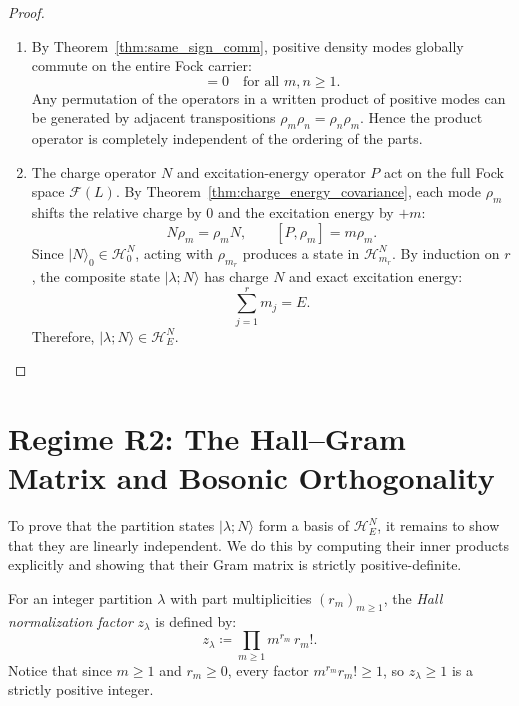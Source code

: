 \begin{proof}
\begin{enumerate}
    \item By Theorem~\ref{thm:same_sign_comm}, positive density modes globally commute on the entire Fock carrier:
    \begin{equation}
    [\rho_m, \rho_n] = 0 \quad \text{for all } m, n \ge 1.
    \end{equation}
    Any permutation of the operators in a written product of positive modes can be generated by adjacent transpositions $\rho_m \rho_n = \rho_n \rho_m$. Hence the product operator is completely independent of the ordering of the parts.
    \item The charge operator $N$ and excitation-energy operator $P$ act on the full Fock space $\mathcal{F}(L)$. By Theorem~\ref{thm:charge_energy_covariance}, each mode $\rho_m$ shifts the relative charge by $0$ and the excitation energy by $+m$:
    \begin{equation}
    N \rho_m = \rho_m N, \qquad [P, \rho_m] = m \rho_m.
    \end{equation}
    Since $|N\rangle_0 \in \mathcal{H}^N_0$, acting with $\rho_{m_r}$ produces a state in $\mathcal{H}^N_{m_r}$. By induction on $r$, the composite state $|\lambda; N\rangle$ has charge $N$ and exact excitation energy:
    \begin{equation}
    \sum_{j=1}^r m_j = E.
    \end{equation}
    Therefore, $|\lambda; N\rangle \in \mathcal{H}^N_E$.
\end{enumerate}
\end{proof}

\section{Regime R2: The Hall--Gram Matrix and Bosonic Orthogonality}

To prove that the partition states $|\lambda; N\rangle$ form a basis of $\mathcal{H}^N_E$, it remains to show that they are linearly independent. We do this by computing their inner products explicitly and showing that their Gram matrix is strictly positive-definite.

\begin{definition}
For an integer partition $\lambda$ with part multiplicities $(r_m)_{m \ge 1}$, the \emph{Hall normalization factor} $z_\lambda$ is defined by:
\begin{equation}
z_\lambda \coloneqq \prod_{m \ge 1} m^{r_m}\, r_m!.
\end{equation}
Notice that since $m \ge 1$ and $r_m \ge 0$, every factor $m^{r_m} r_m! \ge 1$, so $z_\lambda \ge 1$ is a strictly positive integer.
\end{definition}

